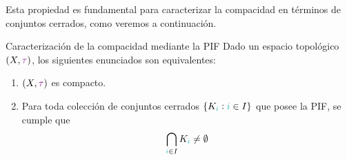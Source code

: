 \documentclass[titlepage,11pt,a4paper]{book}
\newcommand{\ii}{\ensuremath{\textcolor{TealBlue}{i}}}
\newcommand{\taut}{\textcolor{Fuchsia}{\tau}}
\begin{document}
Esta propiedad es fundamental para caracterizar la compacidad en términos de conjuntos cerrados, como veremos a continuación.

\begin{prop*}{Caracterización de la compacidad mediante la PIF}
   Dado un espacio topológico $(X, \taut)$, los siguientes enunciados son equivalentes:
    \begin{enumerate}
          \item[(1)] $(X, \taut)$ es compacto.
          \item[(2)] Para toda colección de conjuntos cerrados $\{K_{\ii} : \ii \in I\}$ que posee la PIF, se cumple que
          \[
          \bigcap_{\ii \in I} K_{\ii} \neq \emptyset
          \]
     \end{enumerate}
\end{prop*}
\end{document}
